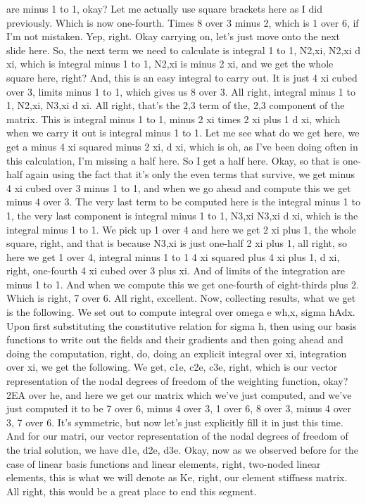 \documentclass[10pt]{article}
\begin{document}
are minus 1 to 1, okay? Let me actually use square brackets here as I did previously. Which is now one-fourth. Times 8 over 3 minus 2, which is 1 over 6, if I'm not mistaken. Yep, right. Okay carrying on, let's just move onto the next slide here. So, the next term we need to calculate is integral 1 to 1, N2,xi, N2,xi d xi, which is integral minus 1 to 1, N2,xi is minus 2 xi, and we get the whole square here, right? And, this is an easy integral to carry out. It is just 4 xi cubed over 3, limits minus 1 to 1, which gives us 8 over 3. All right, integral minus 1 to 1, N2,xi, N3,xi d xi. All right, that's the 2,3 term of the, 2,3 component of the matrix. This is integral minus 1 to 1, minus 2 xi times 2 xi plus 1 d xi, which when we carry it out is integral minus 1 to 1. Let me see what do we get here, we get a minus 4 xi squared minus 2 xi, d xi, which is oh, as I've been doing often in this calculation, I'm missing a half here. So I get a half here. Okay, so that is one-half again using the fact that it's only the even terms that survive, we get minus 4 xi cubed over 3 minus 1 to 1, and when we go ahead and compute this we get minus 4 over 3. The very last term to be computed here is the integral minus 1 to 1, the very last component is integral minus 1 to 1, N3,xi N3,xi d xi, which is the integral minus 1 to 1. We pick up 1 over 4 and here we get 2 xi plus 1, the whole square, right, and that is because N3,xi is just one-half 2 xi plus 1, all right, so here we get 1 over 4, integral minus 1 to 1 4 xi squared plus 4 xi plus 1, d xi, right, one-fourth 4 xi cubed over 3 plus xi. And of limits of the integration are minus 1 to 1. And when we compute this we get one-fourth of eight-thirds plus 2. Which is right, 7 over 6. All right, excellent. Now, collecting results, what we get is the following. We set out to compute integral over omega e wh,x, sigma hAdx. Upon first substituting the constitutive relation for sigma h, then using our basis functions to write out the fields and their gradients and then going ahead and doing the computation, right, do, doing an explicit integral over xi, integration over xi, we get the following. We get, c1e, c2e, c3e, right, which is our vector representation of the nodal degrees of freedom of the weighting function, okay? 2EA over he, and here we get our matrix which we've just computed, and we've just computed it to be 7 over 6, minus 4 over 3, 1 over 6, 8 over 3, minus 4 over 3, 7 over 6. It's symmetric, but now let's just explicitly fill it in just this time. And for our matri, our vector representation of the nodal degrees of freedom of the trial solution, we have d1e, d2e, d3e. Okay, now as we observed before for the case of linear basis functions and linear elements, right, two-noded linear elements, this is what we will denote as Ke, right, our element stiffness matrix. All right, this would be a great place to end this segment.
\end{document}
